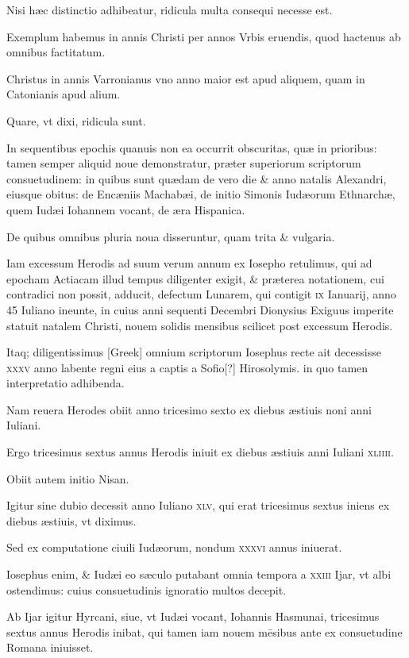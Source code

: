 \begin{parnumbers}
Nisi
hæc distinctio adhibeatur, ridicula multa consequi necesse est.

Exemplum habemus in annis Christi per annos Vrbis eruendis,
quod hactenus ab omnibus factitatum.

Christus in annis Varronianus
vno anno maior est apud aliquem, quam in Catonianis apud alium.

Quare, vt dixi, ridicula sunt.

In sequentibus epochis quanuis
non ea occurrit obscuritas, quæ in prioribus: tamen semper aliquid
noue demonstratur, præter superiorum scriptorum consuetudinem:
in quibus sunt quædam de vero die \& anno natalis Alexandri, eiusque
obitus: de Encæniis Machabæi, de initio Simonis Iudæorum
Ethnarchæ, quem Iudæi Iohannem vocant, de æra Hispanica.

De quibus omnibus pluria noua disseruntur, quam trita \& vulgaria.

Iam
excessum Herodis ad suum verum annum ex Iosepho retulimus,
qui ad epocham Actiacam illud tempus diligenter exigit, \& præterea
notationem, cui contradici non possit, adducit, defectum Lunarem,
qui contigit \textsc{ix} Ianuarij, anno 45 Iuliano ineunte, in cuius
anni sequenti Decembri Dionysius Exiguus imperite statuit natalem
Christi, nouem solidis mensibus scilicet post excessum Herodis.

Itaq; diligentissimus \textgreek{[Greek]} omnium scriptorum Iosephus
recte ait decessisse \textsc{xxxv} anno labente regni eius a captis a Sofio[?]
Hirosolymis. in quo tamen interpretatio adhibenda.

Nam reuera Herodes
obiit anno tricesimo sexto ex diebus æstiuis noni anni Iuliani.

Ergo tricesimus sextus annus Herodis iniuit ex diebus æstiuis anni
Iuliani \textsc{xliiii}.

Obiit autem initio Nisan.

Igitur sine dubio decessit
anno Iuliano \textsc{xlv}, qui erat tricesimus sextus iniens ex diebus æstiuis,
vt diximus.

Sed ex computatione ciuili Iudæorum, nondum
\textsc{xxxvi} annus iniuerat.

Iosephus enim, \& Iudæi eo sæculo putabant
omnia tempora a \textsc{xxiii} Ijar, vt albi ostendimus: cuius consuetudinis
ignoratio multos decepit.

Ab Ijar igitur Hyrcani, siue, vt Iudæi
vocant, Iohannis Hasmunai, tricesimus sextus annus Herodis inibat,
qui tamen iam nouem mēsibus ante ex consuetudine Romana iniuisset.


\end{parnumbers}
